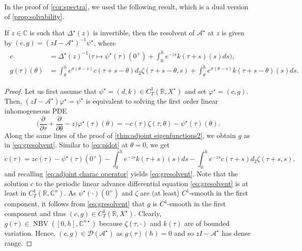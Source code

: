 \documentclass[english]{myarticle}
\DeclareMathOperator{\NBV}{NBV}
\begin{document}
\begin{sloppypar}
In the proof of \cref{cor:spectra}, we used the following result, which is a dual version of \cref{prop:solvability}.
\begin{proposition} \label{prop:resolventadjoint}
If $z \in \mathbb{C}$ is such that $\Delta^\star(z)$ is invertible, then the resolvent of $\mathcal{A}^\star$ at $z$ is given by $(c,g) = (zI- \mathcal{A}^\star)^{-1}\psi^\star$, where
\begin{align}
\begin{split} \label{eq:gresolvent}
    c &= \Delta^\star(z)^{-1} \bigg( \tau \mapsto \psi^\star(\tau)(0^+) + \int_0^h e^{-z s} k(\tau+s)(s) ds \bigg), \\
    g(\tau)(\theta) &= \int_\theta^h e^{\sigma(\theta-s)}c(\tau+s-\theta) d_2 \zeta(\tau+s-\theta,s)  + \int_\theta^h e^{\sigma(\theta-s)} k(\tau+s-\theta)(s) ds.
\end{split}
\end{align}
\end{proposition}
\begin{proof}
Let us first assume that $\psi^\star =(d,k) \in C_T^1(\mathbb{R},X^\star)$ and set $\varphi^\star = (c,g)$. Then, $(zI - \mathcal{A}^\star)\varphi^\star = \psi^{\star}$ is equivalent to solving the first order linear inhomogeneous PDE
\begin{equation*}
    \bigg( \frac{\partial}{\partial \tau} + \frac{\partial}{\partial \theta} - z \bigg) \varphi^\star(\tau)(\theta) = - c(\tau) \zeta(\tau,\theta) - \psi^\star(\tau)(\theta).
\end{equation*}
Along the same lines of the proof of \cref{thm:adjoint eigenfunctions2}, we obtain $g$ as in \eqref{eq:gresolvent}. Similar to \eqref{eq:pidot} at $\theta = 0$, we get
\begin{equation*}
    \dot{c}(\tau) = z c(\tau) - \psi^{\star}(\tau)(0^+) - \int_0^h e^{-z s}k(\tau+s)(s) ds - \int_0^h e^{-zs} c(\tau+s) d_2 \zeta(\tau+s,s),
\end{equation*}
and recalling \eqref{eq:adjoint charac operator} yields \eqref{eq:gresolvent}. Note that the solution $c$ to the periodic linear advance differential equation \eqref{eq:gresolvent} is at least in $C_T^1(\mathbb{R},\mathbb{C}^n)$. As $\psi^\star(\cdot)(0^+)$ and $\zeta$ are (at least) $C^1$-smooth in the first component, it follows from \eqref{eq:gresolvent} that $g$ is $C^1$-smooth in the first component and thus $(c,g) \in C_T^1(\mathbb{R},X^\star)$. Clearly, $g(\tau) \in \NBV([0,h],\mathbb{C}^{n \star})$ because $\zeta(\tau,\cdot)$ and $k(\tau)$ are of bounded variation. Hence, $(c,g) \in \mathcal{D}(\mathcal{A}^\star)$ as $g(\tau)(h) = 0$ and so $zI - \mathcal{A}^{\star}$ has dense range.


\end{proof}
\end{sloppypar}
\end{document}
